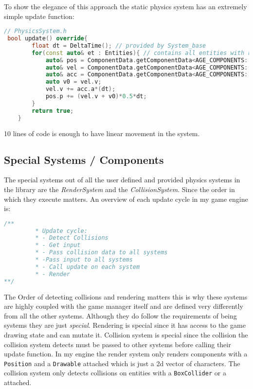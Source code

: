 \documentclass[16pt,a4paper]{article}
\begin{document}
To show the elegance of this approach the static physics system has an extremely simple update function:
\begin{lstlisting}[language=c++]
// PhysicsSystem.h
 bool update() override{
        float dt = DeltaTime(); // provided by System_base
        for(const auto& et : Entities){ // contains all entities with required signature
            auto& pos = ComponentData.getComponentData<AGE_COMPONENTS::Position>(et);
            auto& vel = ComponentData.getComponentData<AGE_COMPONENTS::Velocity>(et);
            auto& acc = ComponentData.getComponentData<AGE_COMPONENTS::Acceleration>(et);
            auto v0 = vel.v;
            vel.v += acc.a*(dt);
            pos.p += (vel.v + v0)*0.5*dt;
        }
        return true;
    }
\end{lstlisting}
10 lines of code is enough to have linear movement in the system. 
\subsection{Special Systems / Components}
The special systems out of all the user defined and provided physics systems in the library are the \textit{RenderSystem} and the \textit{CollisionSystem}. Since the order in which they execute matters. An overview of each update cycle in my game engine is: 

\begin{lstlisting}[language=c++]
/**
         * Update cycle:
         * - Detect Collisions
         * - Get input
         * - Pass collision data to all systems
         * -Pass input to all systems
         * - Call update on each system
         * - Render
**/ 
\end{lstlisting}
The Order of detecting collisions and rendering matters this is why these systems are highly coupled with the game manager itself and are defined very differently from all the other systems. Although they do follow the requirements of being systems they are just \textit{special}. Rendering is special since it has access to the game drawing state and can mutate it. Collision system is special since the collision the collision system detects must be passed to other systems before calling their update function. In my engine the render system only renders components with a \texttt{Position} and a \texttt{Drawable} attached which is just a 2d vector of characters. The collision system only detects collisions on entities with a \texttt{BoxCollider} or a  attached. 
\end{document}
